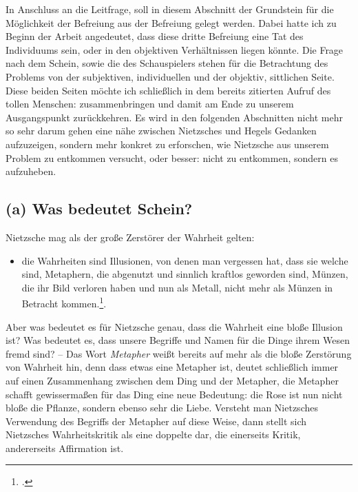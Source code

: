 \documentclass[12pt, a4paper, openany]{report}
\begin{document}
In Anschluss an die Leitfrage, soll in diesem Abschnitt der Grundstein für die Möglichkeit der Befreiung aus der Befreiung gelegt werden.
Dabei hatte ich zu Beginn der Arbeit angedeutet, dass diese dritte Befreiung eine Tat des Individuums sein, oder in den objektiven Verhältnissen liegen könnte. 
Die Frage nach dem Schein, sowie die des Schauspielers stehen für die Betrachtung des Problems von der subjektiven, individuellen und der objektiv, sittlichen Seite. 
Diese beiden Seiten möchte ich schließlich in dem bereits zitierten Aufruf des tollen Menschen:  zusammenbringen und damit am Ende zu unserem Ausgangspunkt zurückkehren. 
Es wird in den folgenden Abschnitten nicht mehr so sehr darum gehen eine nähe zwischen Nietzsches und Hegels Gedanken aufzuzeigen, sondern mehr konkret zu erforschen, wie Nietzsche aus unserem Problem zu entkommen versucht, oder besser: nicht zu entkommen, sondern es aufzuheben.


\subsection{(a) Was bedeutet Schein?}
Nietzsche mag als der große Zerstörer der Wahrheit gelten: 
\begin{itemize}
    \item[] die Wahrheiten sind Illusionen, von denen man vergessen hat, dass sie welche sind, Metaphern, die abgenutzt und sinnlich kraftlos geworden sind, Münzen, die ihr Bild verloren haben und nun als Metall, nicht mehr als Münzen in Betracht kommen.\footcite[][881]{nietzsche_geburt_1999}. 
\end{itemize}
Aber was bedeutet es für Nietzsche genau, dass die Wahrheit eine bloße Illusion ist? 
Was bedeutet es, dass unsere Begriffe und Namen für die Dinge ihrem Wesen fremd sind?
-- Das Wort \emph{Metapher} weißt bereits auf mehr als die bloße Zerstörung von Wahrheit hin, denn dass etwas eine Metapher ist, deutet schließlich immer auf einen Zusammenhang zwischen dem Ding und der Metapher, die Metapher schafft gewissermaßen für das Ding eine neue Bedeutung: 
die Rose ist nun nicht bloße die Pflanze, sondern ebenso sehr die Liebe.
Versteht man Nietzsches Verwendung des Begriffs der Metapher auf diese Weise, dann stellt sich Nietzsches Wahrheitskritik als eine doppelte dar, die einerseits Kritik, andererseits Affirmation ist.\\
\end{document}

